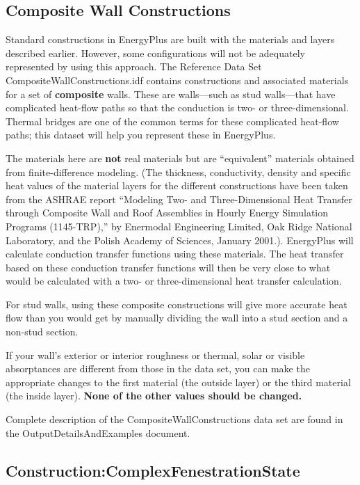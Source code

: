 \subsection{Composite Wall Constructions}\label{composite-wall-constructions}

Standard constructions in EnergyPlus are built with the materials and layers described earlier. However, some configurations will not be adequately represented by using this approach. The Reference Data Set CompositeWallConstructions.idf contains constructions and associated materials for a set of \textbf{composite} walls. These are walls---such as stud walls---that have complicated heat-flow paths so that the conduction is two- or three-dimensional. Thermal bridges are one of the common terms for these complicated heat-flow paths; this dataset will help you represent these in EnergyPlus.

The materials here are \textbf{not} real materials but are ``equivalent'' materials obtained from finite-difference modeling. (The thickness, conductivity, density and specific heat values of the material layers for the different constructions have been taken from the ASHRAE report ``Modeling Two- and Three-Dimensional Heat Transfer through Composite Wall and Roof Assemblies in Hourly Energy Simulation Programs (1145-TRP),'' by Enermodal Engineering Limited, Oak Ridge National Laboratory, and the Polish Academy of Sciences, January 2001.). EnergyPlus will calculate conduction transfer functions using these materials. The heat transfer based on these conduction transfer functions will then be very close to what would be calculated with a two- or three-dimensional heat transfer calculation.

For stud walls, using these composite constructions will give more accurate heat flow than you would get by manually dividing the wall into a stud section and a non-stud section.

If your wall's exterior or interior roughness or thermal, solar or visible absorptances are different from those in the data set, you can make the appropriate changes to the first material (the outside layer) or the third material (the inside layer). \textbf{None of the other values should be changed.}

\begin{callout}
Complete description of the CompositeWallConstructions data set are found in the OutputDetailsAndExamples document.
\end{callout}

\subsection{Construction:ComplexFenestrationState}\label{constructioncomplexfenestrationstate}

